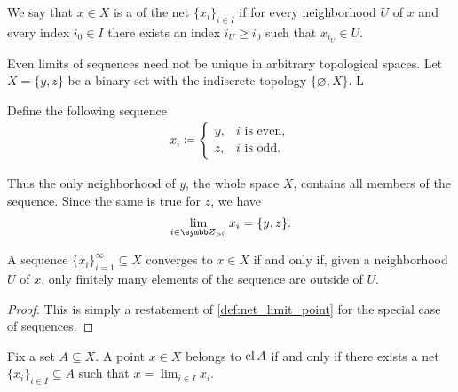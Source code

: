 \begin{definition}\label{def:net_cluster_point}\cite[50]{Engelking1989}
  We say that \( x \in X \) is a  of the net \( \{ x_i \}_{i \in I} \) if for every neighborhood \( U \) of \( x \) and every index \( i_0 \in I \) there exists an index \( i_U \geq i_0 \) such that \( x_{i_U} \in U \).
\end{definition}

\begin{example}\label{ex:multiple_limit_points_of_net}
  Even limits of sequences need not be unique in arbitrary topological spaces. Let \( X = \{ y, z \} \) be a binary set with the indiscrete topology \( \{ \varnothing, X \} \). L

  Define the following sequence
  \begin{align*}
    x_i \coloneqq \begin{cases}
      y, &i \text{ is even}, \\
      z, &i \text{ is odd}.
    \end{cases}
  \end{align*}

  Thus the only neighborhood of \( y \), the whole space \( X \), contains all members of the sequence. Since the same is true for \( z \), we have
  \begin{equation*}
    \lim_{i \in \Z_{>0}} x_i = \{ y, z \}.
  \end{equation*}
\end{example}

\begin{proposition}\label{thm:sequence_converges_iff_almost_entirely_in_neighborhood}
  A sequence \( \{ x_i \}_{i=1}^\infty \subseteq X \) converges to \( x \in X \) if and only if, given a neighborhood \( U \) of \( x \), only finitely many elements of the sequence are outside of \( U \).
\end{proposition}
\begin{proof}
  This is simply a restatement of \cref{def:net_limit_point} for the special case of sequences.
\end{proof}

\begin{proposition}\label{thm:limit_point_iff_in_closure}\cite[proposition 1.6.3]{Engelking1989}
  Fix a set \( A \subseteq X \). A point \( x \in X \) belongs to \( \operatorname{cl}{A} \) if and only if there exists a net \( \{ x_i \}_{i \in I} \subseteq A \) such that \( x = \lim_{i \in I} x_i \).
\end{proposition}

